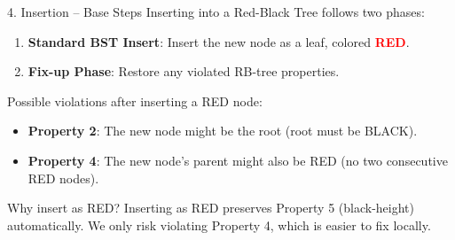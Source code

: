 \documentclass{beamer}
\begin{document}
\begin{frame}{4. Insertion -- Base Steps}
Inserting into a Red-Black Tree follows two phases:

\begin{enumerate}
    \item \textbf{Standard BST Insert}: Insert the new node as a leaf, colored \textcolor{red}{\textbf{RED}}.
    \item \textbf{Fix-up Phase}: Restore any violated RB-tree properties.
\end{enumerate}

\vspace{0.5em}
Possible violations after inserting a RED node:
\begin{itemize}
    \item \textbf{Property 2}: The new node might be the root (root must be BLACK).
    \item \textbf{Property 4}: The new node's parent might also be RED (no two consecutive RED nodes).
\end{itemize}

\begin{block}{Why insert as RED?}
Inserting as RED preserves Property 5 (black-height) automatically. We only risk violating Property 4, which is easier to fix locally.
\end{block}
\end{frame}
\end{document}
